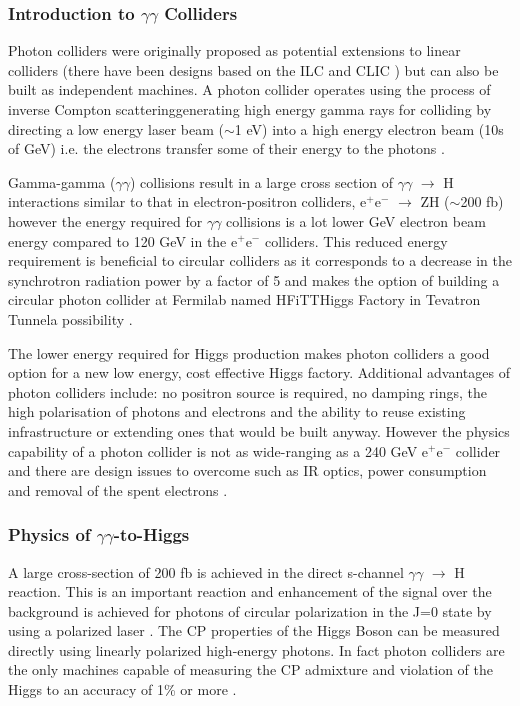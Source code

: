 \subsubsection{Introduction to $\gamma\gamma$ Colliders}
Photon colliders were originally proposed as potential extensions to linear colliders (there have been designs based on the ILC and CLIC \cite{CLIC:Multilinear}) but can also be built as independent machines. A photon collider operates using the process of inverse Compton scattering\textemdash generating  high energy gamma rays for colliding by directing a low energy laser beam ($\sim$1 eV) into a high energy electron beam (10s of GeV) i.e. the electrons transfer some of their energy to the photons \cite{Chou:Higgs}.

Gamma-gamma ($\gamma\gamma$) collisions result in a large cross section of $\gamma\gamma$ $\rightarrow$ H interactions similar to that in electron-positron colliders, e$^{+}$e$^{-}$ $\rightarrow$ ZH ($\sim$200 fb) \cite{Chou:Higgs} however the energy required for $\gamma\gamma$ collisions is a lot lower GeV electron beam energy compared to 120 GeV in the e$^{+}$e$^{-}$ colliders. This reduced energy requirement is beneficial to circular colliders as it corresponds to a decrease in the synchrotron radiation power by a factor of 5 and makes the option of building a circular photon collider at Fermilab named HFiTT\textemdash Higgs Factory in Tevatron Tunnel\textemdash a possibility \cite{Chou:Higgs}. 

The lower energy required for Higgs production makes photon colliders a good option for a new low energy, cost effective Higgs factory. Additional advantages of photon colliders include: no positron source is required, no damping rings, the high polarisation of photons and electrons and the ability to reuse existing infrastructure or extending ones that would be built anyway. However the physics capability of a photon collider is not as wide-ranging as a 240 GeV e$^{+}$e$^{-}$ collider and there are design issues to overcome such as IR optics, power consumption and removal of the spent electrons \cite{Blondel:HiggsF}.
 
\subsubsection{Physics of $\gamma\gamma$-to-Higgs}
A large cross-section of 200 fb is achieved in the direct s-channel $\gamma\gamma$ $\rightarrow$ H reaction. This is an important reaction and enhancement of the signal over the background is achieved for photons of circular polarization in the J=0 state by using a polarized laser \cite{Blondel:HiggsF}.  The CP properties of the Higgs Boson can be measured directly using linearly polarized high-energy photons. In fact photon colliders are the only machines capable of measuring the CP admixture and violation of the Higgs to an accuracy of 1\% or more \cite{Chou:Higgs}.

